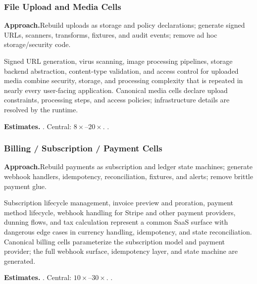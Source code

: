\subsubsection{File Upload and Media Cells}
\label{ssec:media-cells}

\smallskip\noindent
\textbf{Approach.}\quad Rebuild uploads as storage and policy declarations; generate signed URLs, scanners, transforms, fixtures, and audit events; remove ad hoc storage/security code.

Signed URL generation, virus scanning, image processing pipelines,
storage backend abstraction, content-type validation, and access control
for uploaded media combine security, storage, and processing complexity
that is repeated in nearly every user-facing application.  Canonical
media cells declare upload constraints, processing steps, and access
policies; infrastructure details are resolved by the runtime.

\smallskip\noindent
\textbf{Estimates.}\quad
{}.\quad
Central: $8\times$--$20\times$.\quad
{}.

\subsubsection{Billing / Subscription / Payment Cells}
\label{ssec:billing-cells}

\smallskip\noindent
\textbf{Approach.}\quad Rebuild payments as subscription and ledger state machines; generate webhook handlers, idempotency, reconciliation, fixtures, and alerts; remove brittle payment glue.

Subscription lifecycle management, invoice preview and proration,
payment method lifecycle, webhook handling for Stripe and other payment
providers, dunning flows, and tax calculation represent a common SaaS
surface with dangerous edge cases in currency handling, idempotency, and
state reconciliation.  Canonical billing cells parameterize the
subscription model and payment provider; the full webhook surface,
idempotency layer, and state machine are generated.

\smallskip\noindent
\textbf{Estimates.}\quad
{}.\quad
Central: $10\times$--$30\times$.\quad
{}.

